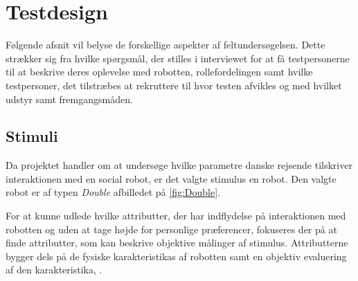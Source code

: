 \section*{Testdesign}
\label{Testdesign}
%
Følgende afsnit vil belyse de forskellige aspekter af feltundersøgelsen. Dette strækker sig fra hvilke spørgsmål, der stilles i interviewet for at få testpersonerne til at beskrive deres oplevelse med robotten, rollefordelingen samt hvilke testpersoner, det tilstræbes at rekruttere til hvor testen afvikles og med hvilket udstyr samt fremgangsmåden.

\subsection*{Stimuli}
\label{Stimuli}
%
Da projektet handler om at undersøge hvilke parametre danske rejsende tilskriver interaktionen med en social robot, er det valgte stimulus en robot. Den valgte robot er af typen \textit{Double} afbilledet på \autoref{fig:Double}.

For at kunne udlede hvilke attributter, der har indflydelse på interaktionen med robotten og uden at tage højde for personlige præferencer, fokuseres der på at finde attributter, som kan beskrive objektive målinger af stimulus. Attributterne bygger dels på de fysiske karakteristikas af robotten samt en objektiv evaluering af den karakteristika, \parencite[s. 2]{PDF:AttributeIdentificatoin}. 

